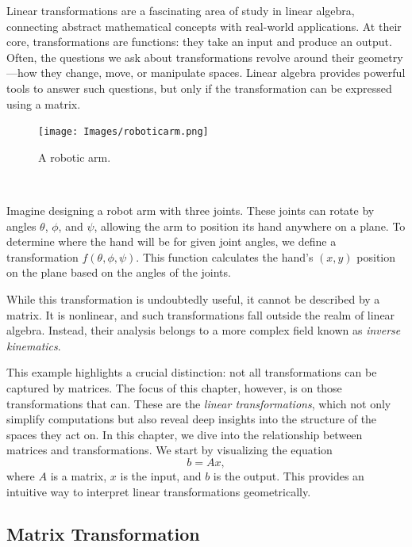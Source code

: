\documentclass[a4paper,12pt]{article}
\begin{document}
\small

\begin{flushleft}
Linear transformations are a fascinating area of study in linear algebra, connecting abstract mathematical concepts with real-world applications. At their core, transformations are functions: they take an input and produce an output. Often, the questions we ask about transformations revolve around their geometry—how they change, move, or manipulate spaces. Linear algebra provides powerful tools to answer such questions, but only if the transformation can be expressed using a matrix.
\end{flushleft}
    \begin{figure}[H]
    \centering
    \texttt{[image: Images/roboticarm.png]}
    \caption{A robotic arm.}
    \label{fig:robotic-arm}
\end{figure}\\
\begin{flushleft}
    Imagine designing a robot arm with three joints. These joints can rotate by angles \( \theta \), \( \phi \), and \( \psi \), allowing the arm to position its hand anywhere on a plane. To determine where the hand will be for given joint angles, we define a transformation \( f(\theta, \phi, \psi) \). This function calculates the hand's \( (x, y) \) position on the plane based on the angles of the joints.

While this transformation is undoubtedly useful, it cannot be described by a matrix. It is nonlinear, and such transformations fall outside the realm of linear algebra. Instead, their analysis belongs to a more complex field known as \textit{inverse kinematics}.

This example highlights a crucial distinction: not all transformations can be captured by matrices. The focus of this chapter, however, is on those transformations that can. These are the \textit{linear transformations}, which not only simplify computations but also reveal deep insights into the structure of the spaces they act on.
In this chapter, we dive into the relationship between matrices and transformations. We start by visualizing the equation 
\[
b = A x,
\]
where \( A \) is a matrix, \( x \) is the input, and \( b \) is the output. This provides an intuitive way to interpret linear transformations geometrically.

\end{flushleft}

\subsection{Matrix Transformation}\label{bigsection:matrix-transformation}
\end{document}
